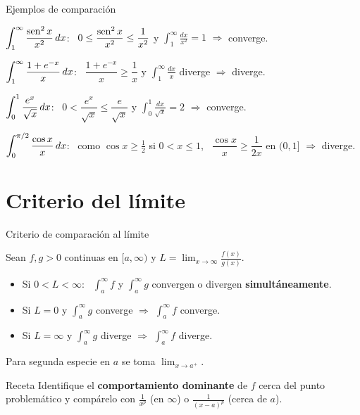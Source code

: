 \documentclass[10pt,aspectratio=169]{beamer}
\begin{document}
\begin{frame}{Ejemplos de comparación}
  \begin{ejemplo}[2]
    $\displaystyle\int_1^\infty\frac{\operatorname{sen}^2x}{x^2}\,dx$: \ $0\le\dfrac{\operatorname{sen}^2x}{x^2}\le\dfrac1{x^2}$ y $\int_1^\infty\frac{dx}{x^2}=1$ $\Rightarrow$ converge.
  \end{ejemplo}
  \begin{ejemplo}[3]
    $\displaystyle\int_1^\infty\frac{1+e^{-x}}{x}\,dx$: \ $\dfrac{1+e^{-x}}{x}\ge\dfrac1x$ y $\int_1^\infty\frac{dx}x$ diverge $\Rightarrow$ diverge.
  \end{ejemplo}
  \begin{ejemplo}
    $\displaystyle\int_0^1\frac{e^{x}}{\sqrt x}\,dx$: \ $0<\dfrac{e^x}{\sqrt x}\le\dfrac{e}{\sqrt x}$ y $\int_0^1\frac{dx}{\sqrt x}=2$ $\Rightarrow$ converge.
  \end{ejemplo}
  \begin{ejemplo}
    $\displaystyle\int_0^{\pi/2}\frac{\cos x}{x}\,dx$: \ como $\cos x\ge\frac12$ si $0<x\le1$, \
    $\dfrac{\cos x}{x}\ge\dfrac1{2x}$ en $(0,1]$ $\Rightarrow$ diverge.
  \end{ejemplo}
\end{frame}

\section{Criterio del límite}

\begin{frame}{Criterio de comparación al límite}
  \begin{teorema}
    Sean $f,g>0$ continuas en $[a,\infty)$ y $\displaystyle L=\lim_{x\to\infty}\frac{f(x)}{g(x)}$.
    \begin{itemize}
      \item Si $0<L<\infty$: \ $\int_a^\infty f$ y $\int_a^\infty g$ convergen o divergen \textbf{simultáneamente}.
      \item Si $L=0$ y $\int_a^\infty g$ converge $\Rightarrow$ $\int_a^\infty f$ converge.
      \item Si $L=\infty$ y $\int_a^\infty g$ diverge $\Rightarrow$ $\int_a^\infty f$ diverge.
    \end{itemize}
    Para segunda especie en $a$ se toma $\lim_{x\to a^+}$.
  \end{teorema}
  \begin{block}{Receta}
    Identifique el \textbf{comportamiento dominante} de $f$ cerca del punto problemático y compárelo con
    $\frac1{x^p}$ (en $\infty$) o $\frac1{(x-a)^p}$ (cerca de $a$).
  \end{block}
\end{frame}
\end{document}
